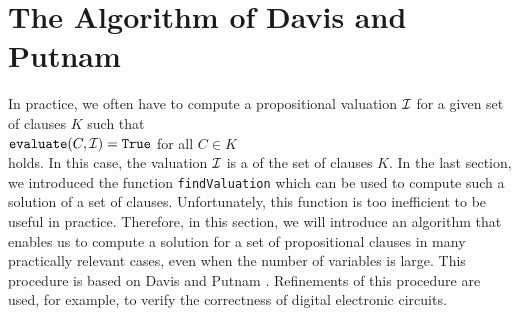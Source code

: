
\section{The Algorithm of Davis and Putnam}
In practice, we often have to compute a propositional valuation $\mathcal{I}$ for a given set of clauses $K$ such that
\\[0.2cm]
\hspace*{1.3cm} $\texttt{evaluate}(C,\mathcal{I}) = \texttt{True}$ \quad for all $C \in K$ \\[0.2cm]
holds. In this case,  the valuation $\mathcal{I}$ is a  of the set of clauses $K$. In
the last section, we introduced the function \texttt{findValuation} which can be used to compute
such a solution of a set of clauses.  Unfortunately, this function is too inefficient to be useful in
practice.
Therefore, in this section, we will introduce an algorithm that enables us to compute a solution for a
set of propositional clauses in many practically relevant cases, even when the number of variables is
large. This procedure is based on Davis and Putnam \cite{davis:1960, davis:1962}. Refinements of this procedure
\cite{moskewicz:2001} are used, for example, to verify the correctness of digital electronic circuits. 

